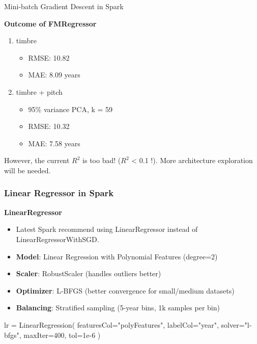 \documentclass{beamer}
\begin{document}
\begin{frame}{Mini-batch Gradient Descent in Spark}

\textbf{Outcome of FMRegressor}
\vspace{1cm}
\begin{multicols}{2}
\begin{enumerate}
    \item timbre
        \begin{itemize}
            \item RMSE: 10.82    
            \item MAE: 8.09 years
        \end{itemize}
    \columnbreak
    \item timbre + pitch
        \begin{itemize}
            \item 95\% variance PCA, k = 59
            \item RMSE: 10.32 
            \item MAE: 7.58 years
        \end{itemize}
\end{enumerate}
\end{multicols}
\begin{center}
    However, the current $R^2$ is too bad! ($R^2$ < 0.1 !).
    More architecture exploration will be needed.
\end{center}
\end{frame}

\begin{frame}[fragile]
    \frametitle{Linear Regressor in Spark}
    \textbf{LinearRegressor}
    \begin{itemize}
        \item Latest Spark recommend using LinearRegressor instead of LinearRegressorWithSGD. 
        \item \textbf{Model}: Linear Regression with Polynomial Features (degree=2)
        \item \textbf{Scaler}: RobustScaler (handles outliers better)
        \item \textbf{Optimizer}: L-BFGS (better convergence for small/medium datasets)
        \item \textbf{Balancing}: Stratified sampling (5-year bins, 1k samples per bin)
    \end{itemize}
    
    \begin{mycodetiny}
        lr = LinearRegression(
            featuresCol="polyFeatures",
            labelCol="year",
            solver="l-bfgs",
            maxIter=400,
            tol=1e-6
        )
    \end{mycodetiny}
\end{frame}
\end{document}
